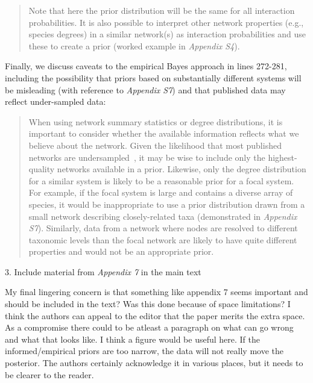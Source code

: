 \documentclass[12pt]{letter}
\newenvironment{refquote}{\bigskip \begin{it}}{\end{it}\smallskip}
\begin{document}
		\begin{quotation}

		Note that here the prior distribution will be the same for all interaction probabilities. It is also possible to interpret other network properties (e.g., species degrees) in a similar network(s) as interaction probabilities and use these to create a prior (worked example in \emph{Appendix S4}).

		\end{quotation}


		Finally, we discuss caveats to the empirical Bayes approach in lines 272-281, including the possibility that priors based on substantially different systems will be misleading (with reference to \emph{Appendix S7}) and that published data may reflect under-sampled data:


		\begin{quotation}

			When using network summary statistics or degree distributions, it is important to consider whether the available information reflects what we believe about the network. Given the likelihood that most published networks are undersampled~\citep{Jordano2016}, it may be wise to include only the highest-quality networks available in a prior. Likewise, only the degree distribution for a similar system is likely to be a reasonable prior for a focal system. For example, if the focal system is large and contains a diverse array of species, it would be inappropriate to use a prior distribution drawn from a small network describing closely-related taxa (demonstrated in \emph{Appendix S7}). Similarly, data from a network where nodes are resolved to different taxonomic levels than the focal network are likely to have quite different properties and would not be an appropriate prior.

		\end{quotation}




	3. Include material from \emph{Appendix 7} in the main text

		\begin{refquote}
		
			My final lingering concern is that something like appendix 7 seems important and should be included in the text? Was this done because of space limitations? I think the authors can appeal to the editor that the paper merits the extra space. As a compromise there could to be atleast a paragraph on what can go wrong and what that looks like. I think a figure would be useful here. If the informed/empirical priors are too narrow, the data will not really move the posterior. The authors certainly acknowledge it in various places, but it needs to be clearer to the reader.

		\end{refquote}
\end{document}

